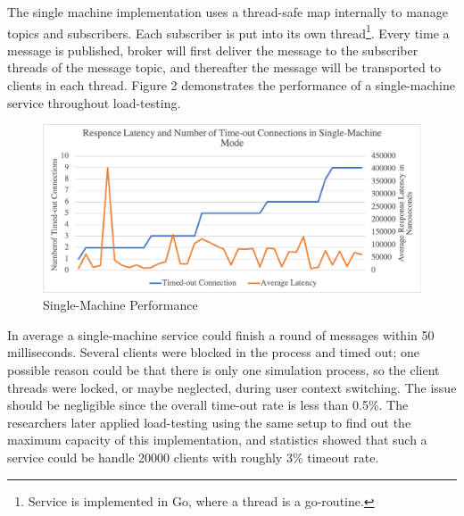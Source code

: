 The single machine implementation uses a thread-safe map internally to manage topics and subscribers. Each subscriber is put into its own thread\footnote{Service is implemented in Go\citep{golang}, where a thread is a go-routine.}. Every time a message is published, broker will first deliver the message to the subscriber threads of the message topic, and thereafter the message will be transported to clients in each thread. Figure 2 demonstrates the performance of a single-machine service throughout load-testing.

\begin{figure}[H]
	\centering
	\includegraphics[scale=0.33]{figure/single-machine/performance.png}
	\caption{Single-Machine Performance}
\end{figure}

In average a single-machine service could finish a round of messages within 50 milliseconds. Several clients were blocked in the process and timed out; one possible reason could be that there is only one simulation process, so the client threads were locked, or maybe neglected, during user context switching. The issue should be negligible since the overall time-out rate is less than 0.5\%. The researchers later applied load-testing using the same setup to find out the maximum capacity of this implementation, and statistics showed that such a service could be handle 20000 clients with roughly 3\% timeout rate.
